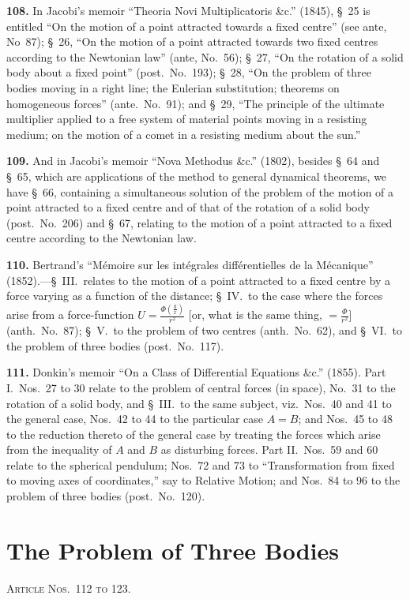 \documentclass[11pt,a4paper]{book}
\begin{document}
\textbf{108.} In Jacobi's memoir ``Theoria Novi Multiplicatoris \&c.'' (1845), \S~25 is entitled ``On the motion of a point attracted towards a fixed centre'' (see ante, No~87); \S~26, ``On the motion of a point attracted towards two fixed centres according to the Newtonian law'' (ante, No.~56); \S~27, ``On the rotation of a solid body about a fixed point'' (post.\ No.~193); \S~28, ``On the problem of three bodies moving in a right line; the Eulerian substitution; theorems on homogeneous forces'' (ante.\ No.~91); and \S~29, ``The principle of the ultimate multiplier applied to a free system of material points moving in a resisting medium; on the motion of a comet in a resisting medium about the sun.''

\textbf{109.} And in Jacobi's memoir ``Nova Methodus \&c.'' (1802), besides \S~64 and \S~65, which are applications of the method to general dynamical theorems, we have \S~66, containing a simultaneous solution of the problem of the motion of a point attracted to a fixed centre and of that of the rotation of a solid body (post.\ No.~206) and \S~67, relating to the motion of a point attracted to a fixed centre according to the Newtonian law.

\textbf{110.} Bertrand's ``M\'emoire sur les int\'egrales diff\'erentielles de la M\'ecanique'' (1852).---\S~III.\ relates to the motion of a point attracted to a fixed centre by a force varying as a function of the distance; \S~IV.\ to the case where the forces arise from a force-function $U = \frac{\Phi(\frac{y}{x})}{r^2}$ [or, what is the same thing, $= \frac{\Phi}{r^2}$] (anth.\ No.~87); \S~V.\ to the problem of two centres (anth.\ No.~62), and \S~VI.\ to the problem of three bodies (post.\ No.~117).

\textbf{111.} Donkin's memoir ``On a Class of Differential Equations \&c.'' (1855). Part I.\ Nos.~27 to 30 relate to the problem of central forces (in space), No.~31 to the rotation of a solid body, and \S~III.\ to the same subject, viz.\ Nos.~40 and 41 to the general case, Nos.~42 to 44 to the particular case $A = B$; and Nos.~45 to 48 to the reduction thereto of the general case by treating the forces which arise from the inequality of $A$ and $B$ as disturbing forces. Part II.\ Nos.~59 and 60 relate to the spherical pendulum; Nos.~72 and 73 to ``Transformation from fixed to moving axes of coordinates,'' say to Relative Motion; and Nos.~84 to 96 to the problem of three bodies (post.\ No.~120).


\section*{The Problem of Three Bodies}
\noindent\textsc{Article Nos.~112 to 123.}
\end{document}
